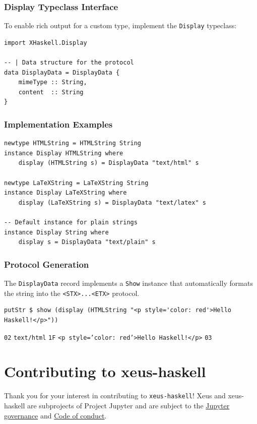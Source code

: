 \documentclass[11pt]{scrartcl}
\begin{document}
\subsubsection{Display Typeclass Interface}


To enable rich output for a custom type, implement the \texttt{Display} typeclass:
\begin{verbatim}
import XHaskell.Display

-- | Data structure for the protocol
data DisplayData = DisplayData {
    mimeType :: String,
    content  :: String
}
\end{verbatim}


\subsubsection{Implementation Examples}


\begin{verbatim}
newtype HTMLString = HTMLString String
instance Display HTMLString where
    display (HTMLString s) = DisplayData "text/html" s

newtype LaTeXString = LaTeXString String
instance Display LaTeXString where
    display (LaTeXString s) = DisplayData "text/latex" s

-- Default instance for plain strings
instance Display String where
    display s = DisplayData "text/plain" s
\end{verbatim}


\subsubsection{Protocol Generation}


The \texttt{DisplayData} record implements a \texttt{Show} instance that automatically formats the string into the \texttt{<STX>...<ETX>} protocol.
\begin{verbatim}
putStr $ show (display (HTMLString "<p style='color: red'>Hello Haskell!</p>"))
\end{verbatim}


\texttt{02} \texttt{text/html} \texttt{1F} \texttt{<p style='color: red'>Hello Haskell!</p>} \texttt{03}

\section{Contributing to xeus-haskell}
\label{sec:contributing}


Thank you for your interest in contributing to \texttt{xeus-haskell}!
Xeus and xeus-haskell are subprojects of Project Jupyter and are subject to the \href{https://github.com/jupyter/governance}{Jupyter governance} and \href{https://github.com/jupyter/governance/blob/master/conduct/code\_of\_conduct.md}{Code of conduct}.
\end{document}
